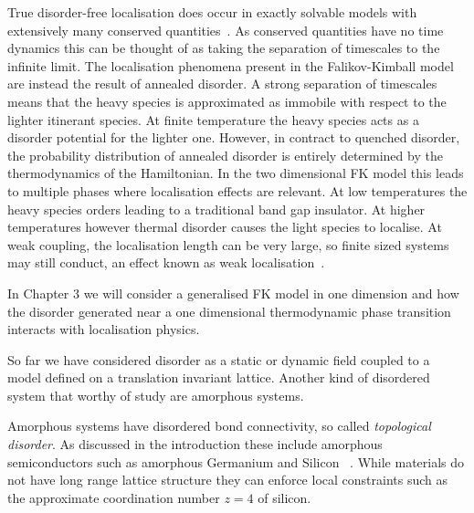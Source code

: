 True disorder-free localisation does occur in exactly solvable models with extensively many conserved quantities~\autocite{smithDisorderFreeLocalization2017}. As conserved quantities have no time dynamics this can be thought of as taking the separation of timescales to the infinite limit. The localisation phenomena present in the Falikov-Kimball model are instead the result of annealed disorder. A strong separation of timescales means that the heavy species is approximated as immobile with respect to the lighter itinerant species. At finite temperature the heavy species acts as a disorder potential for the lighter one. However, in contract to quenched disorder, the probability distribution of annealed disorder is entirely determined by the thermodynamics of the Hamiltonian. In the two dimensional FK model this leads to multiple phases where localisation effects are relevant. At low temperatures the heavy species orders leading to a traditional band gap insulator. At higher temperatures however thermal disorder causes the light species to localise. At weak coupling, the localisation length can be very large, so finite sized systems may still conduct, an effect known as weak localisation~\autocite{antipovInteractionTunedAndersonMott2016}.

In Chapter 3 we will consider a generalised FK model in one dimension and how the disorder generated near a one dimensional thermodynamic phase transition interacts with localisation physics.

So far we have considered disorder as a static or dynamic field coupled to a model defined on a translation invariant lattice. Another kind of disordered system that worthy of study are amorphous systems.

Amorphous systems have disordered bond connectivity, so called \emph{topological disorder}. As discussed in the introduction these include amorphous semiconductors such as amorphous Germanium and Silicon ~\autocite{Yonezawa1983,zallen2008physics,Weaire1971,betteridge1973possible}. While materials do not have long range lattice structure they can enforce local constraints such as the approximate coordination number \(z = 4\) of silicon.

